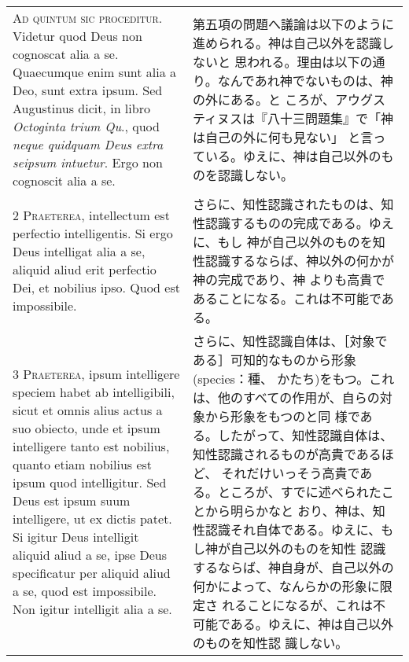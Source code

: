 \documentclass[10pt]{jsarticle} %
\begin{document}
\begin{longtable}{p{21em}p{21em}}

{\huge A}{\scshape d quintum sic proceditur}. Videtur quod Deus non
cognoscat alia a se. Quaecumque enim sunt alia a Deo, sunt extra
ipsum. Sed Augustinus dicit, in libro {\itshape Octoginta trium Qu}.,
quod {\itshape neque quidquam Deus extra seipsum intuetur}. Ergo non
cognoscit alia a se.


&

第五項の問題へ議論は以下のように進められる。神は自己以外を認識しないと
思われる。理由は以下の通り。なんであれ神でないものは、神の外にある。と
ころが、アウグスティヌスは『八十三問題集』で「神は自己の外に何も見ない」
と言っている。ゆえに、神は自己以外のものを認識しない。

\\


{\scshape 2 Praeterea}, intellectum est perfectio
intelligentis. Si ergo Deus intelligat alia a se, aliquid aliud erit
perfectio Dei, et nobilius ipso. Quod est impossibile.

&

さらに、知性認識されたものは、知性認識するものの完成である。ゆえに、もし
神が自己以外のものを知性認識するならば、神以外の何かが神の完成であり、神
よりも高貴であることになる。これは不可能である。


\\


{\scshape 3 Praeterea}, ipsum intelligere speciem habet
ab intelligibili, sicut et omnis alius actus a suo obiecto, unde et
ipsum intelligere tanto est nobilius, quanto etiam nobilius est ipsum
quod intelligitur. Sed Deus est ipsum suum intelligere, ut ex dictis
patet. Si igitur Deus intelligit aliquid aliud a se, ipse Deus
specificatur per aliquid aliud a se, quod est impossibile. Non igitur
intelligit alia a se.


&

さらに、知性認識自体は、［対象である］可知的なものから形象(species：種、
かたち)をもつ。これは、他のすべての作用が、自らの対象から形象をもつのと同
様である。したがって、知性認識自体は、知性認識されるものが高貴であるほど、
それだけいっそう高貴である。ところが、すでに述べられたことから明らかなと
おり、神は、知性認識それ自体である。ゆえに、もし神が自己以外のものを知性
認識するならば、神自身が、自己以外の何かによって、なんらかの形象に限定さ
れることになるが、これは不可能である。ゆえに、神は自己以外のものを知性認
識しない。


\\



\end{longtable}
\end{document}
